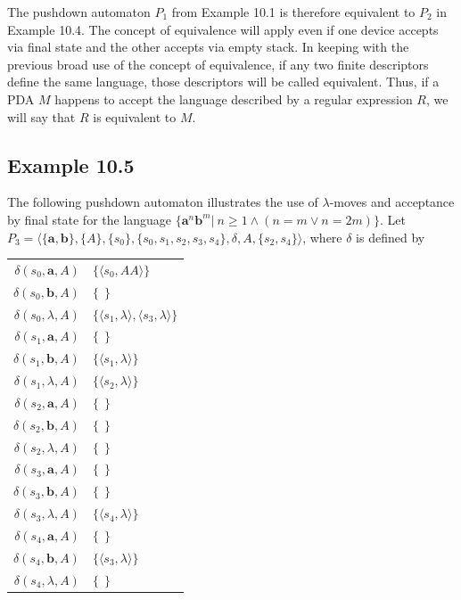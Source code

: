 The pushdown automaton $P_1$ from Example 10.1 is therefore equivalent to $P_2$
in Example 10.4. The concept of equivalence will apply even if one device
accepts via final state and the other accepts via empty stack. In keeping with
the previous broad use of the concept of equivalence, if any two finite
descriptors define the same language, those descriptors will be called
equivalent. Thus, if a PDA $M$ happens to accept the language described by a
regular expression $R$, we will say that $R$ is equivalent to $M$.

\subsection*{Example 10.5}

The following pushdown automaton illustrates the use of $\lambda$-moves and
acceptance by final state for the language $\{\pmb{a}^n\pmb{b}^m|\ n\geq 1\wedge
(n=m \vee n=2m)\}$. Let $P_3=\langle\{\pmb{a},\pmb{b}\},\{A\},\{s_0\},\{s_0,s_1,
s_2,s_3,s_4\},\delta,A,\{s_2,s_4\}\rangle$, where $\delta$ is defined by
\begin{center}\begin{tabular}{r@{ = }l}
$\delta(s_0,\pmb{a},A)$ & $\{\langle s_0,AA\rangle\}$ \\
$\delta(s_0,\pmb{b},A)$ & $\{\ \ \}$ \\
$\delta(s_0,\lambda,A)$ & $\{\langle s_1,\lambda\rangle,\langle s_3,\lambda
	\rangle\}$ \\
$\delta(s_1,\pmb{a},A)$ & $\{\ \ \}$ \\
$\delta(s_1,\pmb{b},A)$ & $\{\langle s_1,\lambda\rangle\}$ \\
$\delta(s_1,\lambda,A)$ & $\{\langle s_2,\lambda\rangle\}$ \\
$\delta(s_2,\pmb{a},A)$ & $\{\ \ \}$ \\
$\delta(s_2,\pmb{b},A)$ & $\{\ \ \}$ \\
$\delta(s_2,\lambda,A)$ & $\{\ \ \}$ \\
$\delta(s_3,\pmb{a},A)$ & $\{\ \ \}$ \\
$\delta(s_3,\pmb{b},A)$ & $\{\ \ \}$ \\
$\delta(s_3,\lambda,A)$ & $\{\langle s_4,\lambda\rangle\}$ \\
$\delta(s_4,\pmb{a},A)$ & $\{\ \ \}$ \\
$\delta(s_4,\pmb{b},A)$ & $\{\langle s_3,\lambda\rangle\}$ \\
$\delta(s_4,\lambda,A)$ & $\{\ \ \}$
\end{tabular}\end{center}
